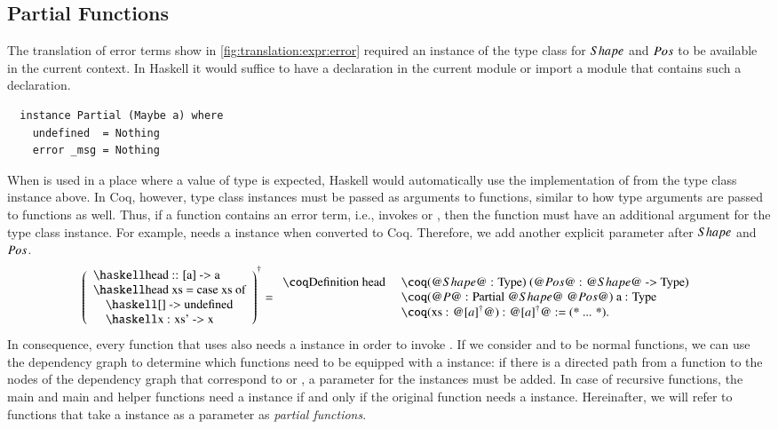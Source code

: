 \subsection{Partial Functions} \label{sec:translation:func-decl:partial}
The translation of error terms show in \autoref{fig:translation:expr:error} required an instance of the  type class for $Shape$ and $Pos$ to be available in the current context.
In Haskell it would suffice to have a  declaration in the current module or import a module that contains such a declaration.
\begin{verbatim}
  instance Partial (Maybe a) where
    undefined  = Nothing
    error _msg = Nothing
\end{verbatim}
When  is used in a place where a value of type  is expected, Haskell would automatically use the implementation of  from the type class instance above.
In Coq, however, type class instances must be passed as arguments to functions, similar to how type arguments are passed to functions as well.
Thus, if a function contains an error term, i.e., invokes  or , then the function must have an additional argument for the  type class instance.
For example,  needs a  instance when converted to Coq.
Therefore, we add another explicit parameter after $Shape$ and $Pos$.
\[
  \toCoq{\left(\begin{array}{l}
    \haskellM{head :: [a] -> a}           \\
    \haskellM{head xs = case xs of}       \\
    \quad\haskellM{[]      -> undefined} \\
    \quad\haskellM{x : xs' -> x}         \\
  \end{array}\right)}
  = \begin{array}{ll}
    \coqM{Definition head}\;
      &\coqM{(@$\Shape$@ : Type) (@$\Pos$@ : @$\Shape$@ -> Type)} \\
      &\coqM{(@$P$@ : Partial @$\Shape$@ @$\Pos$@) {a : Type}}    \\
      &\coqM{(xs : @$\toCoqX{[a]}$@) : @$\toCoqX{[a]}$@ := (* ... *).}
  \end{array}
\]
In consequence, every function that uses  also needs a  instance in order to invoke .
If we consider  and  to be normal functions, we can use the dependency graph to determine which functions need to be equipped with a  instance: if there is a directed path from a function to the nodes of the dependency graph that correspond to  or , a parameter for the  instances must be added.
In case of recursive functions, the main and main and helper functions need a  instance if and only if the original function needs a  instance.
Hereinafter, we will refer to functions that take a  instance as a parameter as \textit{partial functions}.

